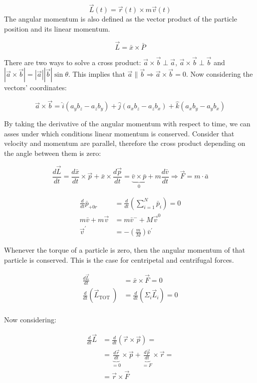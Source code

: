   $$\vec{L}(t) = \vec{r}(t)\times m \vec{v}(t)$$
  The angular momentum is also defined as the vector product of the particle position and its linear momentum.

  $$\vec{L}=\bar{x} \times \bar{P}$$

  There are two ways to solve a cross product: $\vec{a}\times \vec{b}\perp \vec{a}$, $\vec{a}\times \vec{b}\perp \vec{b}$ and $|\vec{a}\times \vec{b}| = |\vec{a}||\vec{b}|\sin\theta$.
  This implies that $\vec{a}\parallel \vec{b}\Rightarrow \vec{a}\times \vec{b} = 0$.
  Now considering the vectors' coordinates:

  $$\vec{a}\times \vec{b} = \hat{i}(a_yb_z - a_zb_y) + \hat{j}(a_xb_z - a_zb_x) + \hat{k}(a_xb_y-a_yb_x)$$

  By taking the derivative of the angular momentum with respect to time, we can asses under which conditions linear momentum is conserved.
  Consider that velocity and momentum are parallel, therefore the cross product depending on the angle between them is zero:

  $$\frac{d \vec{L}}{d t}=\frac{d \bar{x}}{d t} \times \vec{p}+\bar{x} \times \frac{d \vec{p}}{d t}=\underbrace{\bar{v} \times \bar{p}}_{0}+m \frac{d \bar{v}}{d t} \Rightarrow \vec{F}=m \cdot \bar{a}$$

  \begin{align*}
    \frac{d}{d t} \bar{p}_{+0 r}&=\frac{d}{d t}\left(\sum_{i=1}^{N} \bar{p}_{i}\right)=0 \\
    m \bar{v}+m \vec{v}&=m \bar{v}^{-}+M \vec{v}^{0} \\
    \vec{v}^{\prime}&=-\left(\frac{m}{M}\right) \bar{v}^{\prime}
  \end{align*}

  Whenever the torque of a particle is zero, then the angular momentum of that particle is conserved.
  This is the case for centripetal and centrifugal forces.

  \begin{align*}
    \frac{d \vec{L}}{d t}&=\bar{x} \times \vec{F}=0 \\
    \frac{d}{d t}\left(\vec{L}_{\text {TOT }}\right)&=\frac{d}{d t}\left(\Sigma_{i} \vec{L}_{i}\right)=0 \\
  \end{align*}

  Now considering:

  \begin{align*}
    \frac{d{}}{d{t}}\vec{L} &= \frac{d{}}{d{t}}(\vec{r}\times \vec{p})=\\
                            &=\underbrace{\frac{d{\vec{r}}}{d{t}}}_{=0}\times\vec{p} + \underbrace{\frac{d{\vec{p}}}{d{t}}}_{=F}\times\vec{r} =\\
                            &= \vec{r}\times \vec{F}
  \end{align*}

